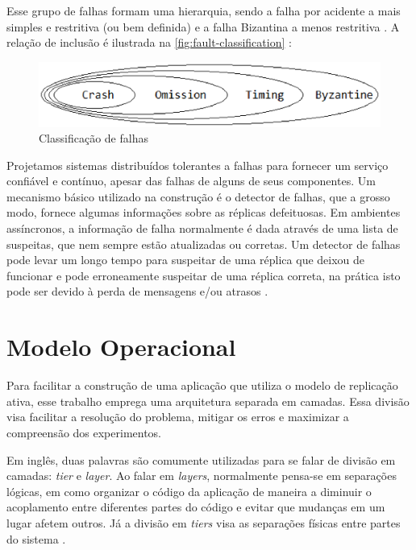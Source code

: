 Esse grupo de falhas formam uma hierarquia, sendo a falha por acidente a mais simples e
restritiva (ou bem definida) e a falha Bizantina a menos restritiva \cite{jalote94}. A
relação de inclusão é ilustrada na \autoref{fig:fault-classification} \cite{cristian86}:

\begin{figure}[htbp]
  \centering
  \includegraphics[width=13cm]{conteudo/capitulos/figuras/classificacao_falhas.eps}
  \caption{Classificação de falhas}
  \label{fig:fault-classification}
\end{figure}

Projetamos sistemas distribuídos tolerantes a falhas para fornecer um serviço confiável e
contínuo, apesar das falhas de alguns de seus componentes. Um mecanismo básico utilizado
na construção é o detector de falhas, que a grosso modo, fornece algumas informações sobre
as réplicas defeituosas. Em ambientes assíncronos, a informação de falha normalmente é
dada através de uma lista de suspeitas, que nem sempre estão atualizadas ou corretas. Um
detector de falhas pode levar um longo tempo para suspeitar de uma réplica que deixou de
funcionar e pode erroneamente suspeitar de uma réplica correta, na prática isto pode ser
devido à perda de mensagens e/ou atrasos \cite{chandra96, chen02}.


\section{Modelo Operacional}

Para facilitar a construção de uma aplicação que utiliza o modelo de replicação ativa,
esse trabalho emprega uma arquitetura separada em camadas. Essa divisão visa facilitar
a resolução do problema, mitigar os erros e maximizar a compreensão dos experimentos.

Em inglês, duas palavras são comumente utilizadas para se falar de divisão em camadas:
\emph{tier} e \emph{layer}. Ao falar em \emph{layers}, normalmente pensa-se em separações
lógicas, em como organizar o código da aplicação de maneira a diminuir o acoplamento
entre diferentes partes do código e evitar que mudanças em um lugar afetem outros. Já a
divisão em \emph{tiers} visa as separações físicas entre partes do sistema
\cite{caelum11}.

